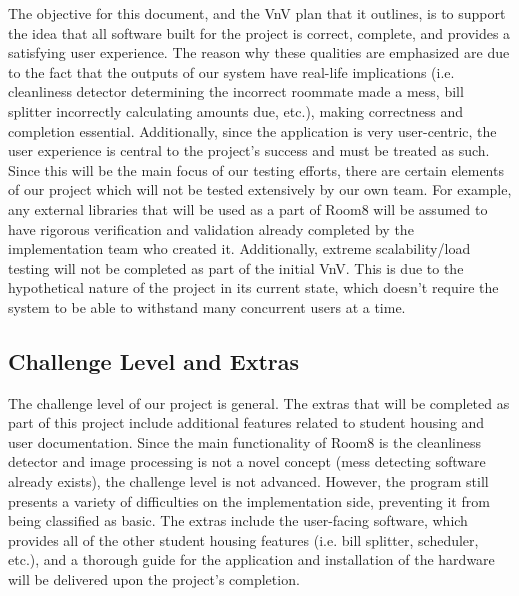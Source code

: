 \documentclass[12pt, titlepage]{article}
\begin{document}
The objective for this document, and the VnV plan that it outlines, is to support the idea that all software built for the project is correct, complete, and provides a satisfying user experience. The reason why these qualities are emphasized are due to the fact that the outputs of our system have real-life implications (i.e. cleanliness detector determining the incorrect roommate made a mess, bill splitter incorrectly calculating amounts due, etc.), making correctness and completion essential. Additionally, since the application is very user-centric, the user experience is central to the project's success and must be treated as such. Since this will be the main focus of our testing efforts, there are certain elements of our project which will not be tested extensively by our own team. For example, any external libraries that will be used as a part of Room8 will be assumed to have rigorous verification and validation already completed by the implementation team who created it. Additionally, extreme scalability/load testing will not be completed as part of the initial VnV. This is due to the hypothetical nature of the project in its current state, which doesn't require the system to be able to withstand many concurrent users at a time. 

\subsection{Challenge Level and Extras}



The challenge level of our project is general. The extras that will be completed as part of this project include additional features related to student housing and user documentation. Since the main functionality of Room8 is the cleanliness detector and image processing is not a novel concept (mess detecting software already exists), the challenge level is not advanced. However, the program still presents a variety of difficulties on the implementation side, preventing it from being classified as basic. The extras include the user-facing software, which provides all of the other student housing features (i.e. bill splitter, scheduler, etc.), and a thorough guide for the application and installation of the hardware will be delivered upon the project's completion.  
\end{document}
